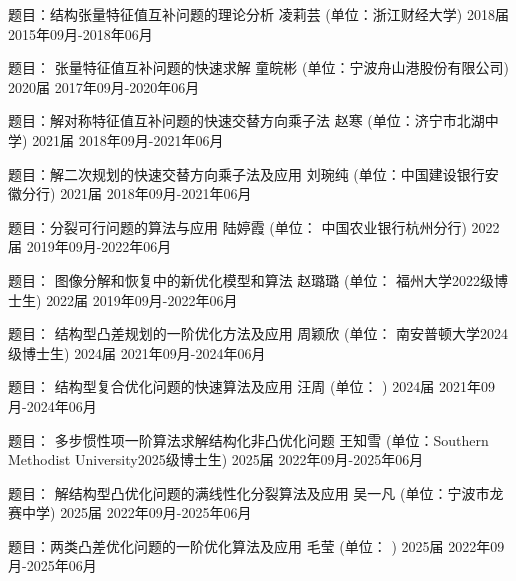 \begin{cventries}
	\cventry
	{题目：结构张量特征值互补问题的理论分析 } %
	{凌莉芸 (单位：浙江财经大学)} %
	{2018届} %
	{2015年09月-2018年06月} %
	{}
	
	\cventry
	{题目： 张量特征值互补问题的快速求解} %
	{童皖彬 (单位：宁波舟山港股份有限公司)} %
	{2020届} %
	{2017年09月-2020年06月} %
	{}
	
		\cventry
	{题目：解对称特征值互补问题的快速交替方向乘子法 } %
	{赵寒  (单位：济宁市北湖中学)} %
	{2021届} %
	{2018年09月-2021年06月} %
	{}
	
			\cventry
	{题目：解二次规划的快速交替方向乘子法及应用 } %
	{刘琬纯  (单位：中国建设银行安徽分行)} %
	{2021届} %
	{2018年09月-2021年06月} %
	{}
	

	

	
				\cventry
	{题目：分裂可行问题的算法与应用 } %
	{陆婷霞 (单位： 中国农业银行杭州分行)} %
	{2022届} %
	{2019年09月-2022年06月} %
	{}
	
			\cventry
	{题目： 图像分解和恢复中的新优化模型和算法} %
	{赵璐璐 (单位： 福州大学2022级博士生)} %
	{2022届} %
	{2019年09月-2022年06月} %
	{}
	
				\cventry
	{题目： 结构型凸差规划的一阶优化方法及应用} %
	{周颖欣 (单位： 南安普顿大学2024级博士生)} %
	{2024届} %
	{2021年09月-2024年06月} %
	{}
	
				\cventry
	{题目： 结构型复合优化问题的快速算法及应用} %
	{汪周 (单位： )} %
	{2024届} %
	{2021年09月-2024年06月} %
	{}
	
					\cventry
	{题目： 多步惯性项一阶算法求解结构化非凸优化问题} %
	{王知雪 (单位：Southern Methodist University2025级博士生)} %
	{2025届} %
	{2022年09月-2025年06月} %
	{}
	
	
					\cventry
	{题目： 解结构型凸优化问题的满线性化分裂算法及应用} %
	{吴一凡 (单位：宁波市龙赛中学)} %
	{2025届} %
	{2022年09月-2025年06月} %
	{}
	
					\cventry
	{题目：两类凸差优化问题的一阶优化算法及应用} %
	{毛莹 (单位： )} %
	{2025届} %
	{2022年09月-2025年06月} %
	{}
\end{cventries}

